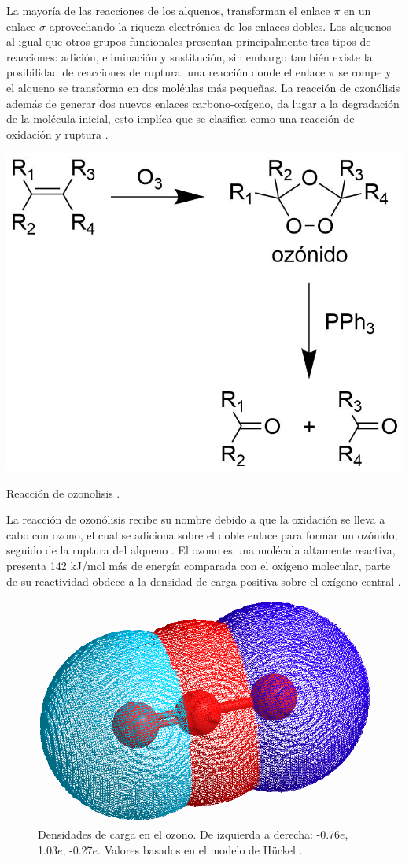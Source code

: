 \documentclass[fleqn,10pt]{SelfArx}
\begin{document}
La mayor\'ia de las reacciones de los alquenos, transforman el enlace $\pi$ en un enlace $\sigma$ aprovechando la riqueza electr\'onica de los enlaces dobles. Los alquenos al igual que otros grupos funcionales presentan principalmente tres tipos de reacciones: adici\'on, eliminaci\'on y sustituci\'on, sin embargo tambi\'en existe la posibilidad de reacciones de ruptura: una reacci\'on donde el enlace $\pi$ se rompe y el alqueno se transforma en dos mol\'eulas m\'as peque\~nas. La reacci\'on de ozon\'olisis adem\'as de generar dos nuevos enlaces carbono-ox\'igeno, da lugar a la degradaci\'on de la mol\'ecula inicial, esto impl\'ica que se clasifica como una reacci\'on de oxidaci\'on y ruptura \cite{Wade2013}\cite{Morrison2002}.
\begin{scheme}[h]
	\centering
	\includegraphics[width=0.7\linewidth]{structures/ozonolisis.png}
	\caption{Reacci\'on de ozonolisis \cite{Wade2013}.}
\end{scheme}

La reacci\'on de ozon\'olisis recibe su nombre debido a que la oxidaci\'on se lleva a cabo con ozono, el cual se adiciona sobre el doble enlace para formar un oz\'onido, seguido de la ruptura del alqueno \cite{Morrison2002}. El ozono es una mol\'ecula altamente reactiva, presenta 142 kJ/mol m\'as de energ\'ia comparada con el ox\'igeno molecular, parte de su reactividad obdece a la densidad de carga positiva sobre el ox\'igeno central \cite{Wade2013}.
\begin{figure}[h]
	\centering
	\includegraphics[width=0.5\linewidth]{structures/ozone.png}
	\caption{Densidades de carga en el ozono. De izquierda a derecha: -0.76$e$, 1.03$e$, -0.27$e$. Valores basados en el modelo de H\"uckel \cite{PerkinElmer}.}
\end{figure}
\end{document}
